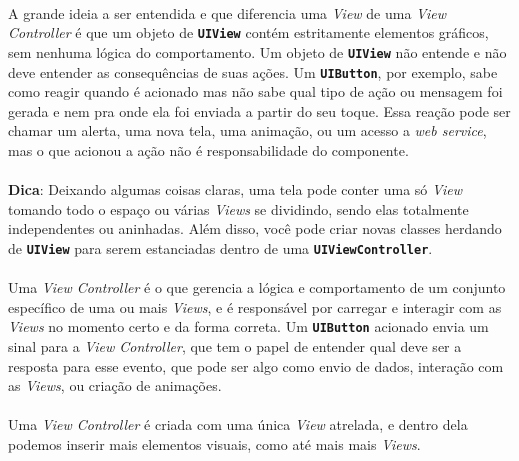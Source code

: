 \documentclass[a4paper,12pt,brazil,doubleside]{book}
\begin{document}
\begin{singlespace}
\paragraph{}A grande ideia a ser entendida e que diferencia uma \emph{View} de uma \emph{View Controller} é que um objeto de \texttt{\textbf{UIView}} contém estritamente elementos gráficos, sem nenhuma lógica do comportamento. Um objeto de \texttt{\textbf{UIView}} não entende e não deve entender as consequências de suas ações. Um \texttt{\textbf{UIButton}}, por exemplo, sabe como reagir quando é acionado mas não sabe qual tipo de ação ou mensagem foi gerada e nem pra onde ela foi enviada a partir do seu toque. Essa reação pode ser chamar um alerta, uma nova tela, uma animação, ou um acesso a \emph{web service}, mas o que acionou a ação não é responsabilidade do componente.

\begin{framed}
\paragraph{}\textbf{Dica}: Deixando algumas coisas claras, uma tela pode conter uma só \emph{View} tomando todo o espaço ou várias \emph{Views} se dividindo, sendo elas totalmente independentes ou aninhadas. Além disso, você pode criar novas classes herdando de \texttt{\textbf{UIView}} para serem estanciadas dentro de uma \texttt{\textbf{UIViewController}}.
\end{framed}

\paragraph{}Uma \emph{View Controller} é o que gerencia a lógica e comportamento de um conjunto específico de uma ou mais \emph{Views}, e é responsável por carregar e interagir com as \emph{Views} no momento certo e da forma correta. Um \texttt{\textbf{UIButton}} acionado envia um sinal para a \emph{View Controller}, que tem o papel de entender qual deve ser a resposta para esse evento, que pode ser algo como envio de dados, interação com as \emph{Views}, ou criação de animações.
\paragraph{}Uma \emph{View Controller} é criada com uma única \emph{View} atrelada, e dentro dela podemos inserir mais elementos visuais, como até mais mais \emph{Views}.

\bigskip


\end{singlespace}
\end{document}
